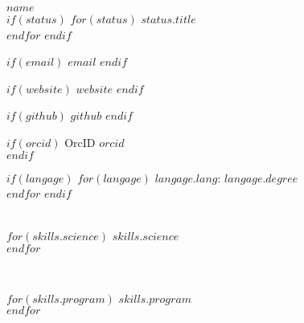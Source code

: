 \documentclass[$fontsize$, letterpaper]{article}
\begin{document}
{\Large \textbf{$name$}}\\[.2cm]
$if(status)$
$for(status)$
{\large{$status.title$}}\\
$endfor$
$endif$

\setlength{\columnsep}{-3cm}
\begin{multicols}{2}



$if(email)$
\faEnvelope \quad \href{mailto:$email$}{$email$}
$endif$

$if(website)$
\faGlobe \quad \href{http://$website$}{$website$}
$endif$

$if(github)$
\faGithub \quad \href{https://github.com/$github$}{$github$}
$endif$

$if(orcid)$
OrcID \quad \href{http://orcid.org/$orcid$}{$orcid$}\\
$endif$

$if(langage)$
$for(langage)$
\textbf{$langage.lang$}: $langage.degree$ \\
$endfor$
$endif$



\columnbreak


\setlength{\columnsep}{0.1cm}
\begin{multicols}{2}


\\

$for(skills.science)$
$skills.science$\\
$endfor$


\columnbreak


\\

\vspace{-.08cm}

$for(skills.program)$
$skills.program$\\
$endfor$


\end{multicols}
\end{multicols}
\end{document}
